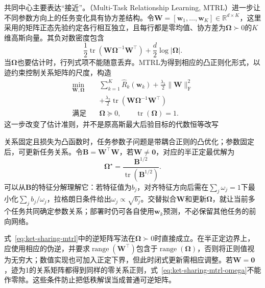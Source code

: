 共同中心主要表达“接近”。（Multi-Task Relationship Learning, MTRL）进一步让不同参数方向上的任务变化具有协方差结构。令$\bm W=[\bm w_1,\ldots,\bm w_K]\in\mathbb R^{d\times K}$，这里采用的矩阵正态先验约定各行相互独立，且每行都是零均值、协方差为$\bm\Omega\succ0$的$K$维高斯向量。其负对数密度包含
\begin{equation}
  \frac12\operatorname{tr}
    (\bm W\bm\Omega^{-1}\bm W^{\top})
  +\frac d2\log|\bm\Omega|.
  \label{eq:ket-sharing-matrix-prior}
\end{equation}
当$\bm\Omega$也要估计时，行列式项不能随意丢弃。MTRL为得到相应的凸正则化形式，以迹约束控制关系矩阵的尺度，构造
\begin{align}
  \min_{\bm W,\bm\Omega}\quad&
  \sum_{k=1}^{K}\hat R_k(\bm w_k)
  +\frac{\lambda_1}{2}\|\bm W\|_{\mathrm F}^2
  \nonumber\\
  &+\frac{\lambda_2}{2}
    \operatorname{tr}(\bm W\bm\Omega^{-1}\bm W^{\top})
  \nonumber\\
  \text{满足}\quad&
  \bm\Omega\succeq0,
  \qquad \operatorname{tr}(\bm\Omega)=1.
  \label{eq:ket-sharing-mtrl}
\end{align}
这一步改变了估计准则，并不是原高斯最大后验目标的代数恒等改写

关系固定且损失为凸函数时，任务参数子问题是带耦合正则的凸优化；参数固定后，可更新任务关系。令$\bm B=\bm W^{\top}\bm W$，若$\bm W\ne\bm0$，对应的半正定最优解为
\begin{equation}
  \bm\Omega^\star
  =\frac{\bm B^{1/2}}
    {\operatorname{tr}(\bm B^{1/2})}.
  \label{eq:ket-sharing-mtrl-omega}
\end{equation}
可以从$\bm B$的特征分解理解它：若特征值为$b_j$，对齐特征方向后需在$\sum_j\omega_j=1$下最小化$\sum_j b_j/\omega_j$，拉格朗日条件给出$\omega_j\propto\sqrt{b_j}$。交替拟合$\bm W$和更新$\bm\Omega$，就让当前多个任务共同确定参数关系；部署时仍可各自使用$\bm w_k$预测，不必保留其他任务的前向网络。

式~\eqref{eq:ket-sharing-mtrl}中的逆矩阵写法在$\bm\Omega\succ0$时直接成立。在半正定边界上，应使用相应的伪逆，并要求$\operatorname{range}(\bm W^{\top})$包含于$\operatorname{range}(\bm\Omega)$，否则将正则值视为无穷大；数值实现也可加入正定下界，但此时闭式更新需相应调整。若$\bm W=\bm0$，迹为1的关系矩阵都得到同样的零关系正则，式~\eqref{eq:ket-sharing-mtrl-omega}不能作零除。这些条件防止把低秩解误当成普通可逆矩阵。

